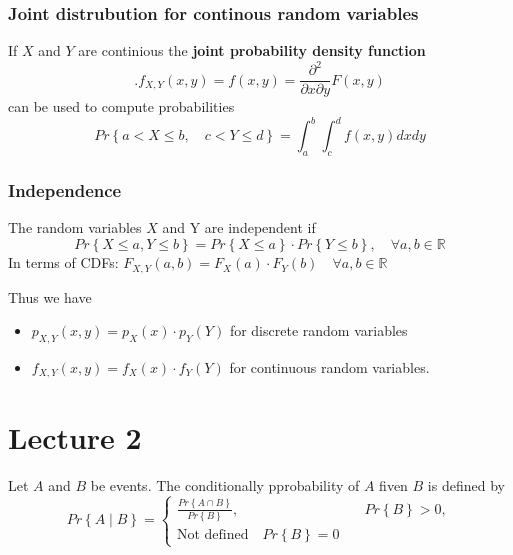 \documentclass{article}
\theoremstyle{remark}
\begin{document}
\subsubsection{Joint distrubution for continous random variables}%
\label{ssub:joint_distrobution_for_continous_random_variables}

If $X$ and $Y$ are continious the \textbf{joint probability density function}  \[
.f_{X,Y} \left( x,y \right) = f\left( x,y \right) = \frac{\partial ^2}{\partial x \partial y } F\left( x,y \right)   
\]  can be used to compute probabilities \[
Pr\left\{ a < X \le b,  \quad  c < Y \le d  \right\} = \int_{a}^{b} \int_{c}^{d} f\left( x,y \right)dxdy    
\] 

\subsubsection{Independence}%
\label{ssub:independence_3}

The random variables $X$ and Y are independent if \[
Pr\left\{ X \le a , Y \le b \right\} =  Pr\left\{ X \le a \right\} \cdot  Pr\left\{ Y \le b \right\}, \quad  \forall a,b \in  \mathbb{R}  
\] 
In terms of CDFs:  $F_{X,Y}(a,b ) =  F_{X}\left( a \right)\cdot F_{Y}\left( b \right) \quad  \forall a,b \in \mathbb{R}  $
\par
Thus we have 
\begin{itemize}
  \item $p_{X,Y} \left( x,y \right) = p_{X}\left( x \right) \cdot  p_{Y}\left( Y \right)$ for discrete random variables
  \item $f_{X,Y}\left( x,y \right) = f_{X}\left( x \right) \cdot  f_{Y}\left( Y \right)$ for continuous random variables.
\end{itemize}






 
 




\newpage
\section{Lecture 2}%
\label{sec:lecture_2}

\begin{definition}
  Let $A$ and $B$ be events.  The conditionally pprobability of $A$ fiven $B$ is defined by \[
  Pr \left\{ A  \mid  B \right\} = \begin{cases}
    \frac{Pr \left\{ A \cap B \right\}}{ Pr\left\{ B \right\} } ,  &  \quad  Pr\left\{ B \right\} > 0,   \\
    \text{Not defined} \quad  Pr\left\{ B \right\} = 0 
  \end{cases}
  \] 
\end{definition}
\end{document}

